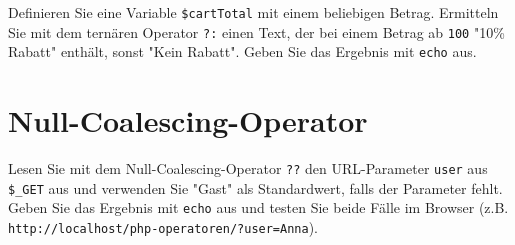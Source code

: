 \documentclass[a4paper,12pt]{article}
\begin{document}
Definieren Sie eine Variable \texttt{\$cartTotal} mit einem beliebigen Betrag. Ermitteln Sie mit dem ternären Operator \texttt{?:} einen Text, der bei einem Betrag ab \texttt{100} "10\% Rabatt" enthält, sonst "Kein Rabatt". Geben Sie das Ergebnis mit \texttt{echo} aus.

\section{Null-Coalescing-Operator}

Lesen Sie mit dem Null-Coalescing-Operator \texttt{??} den URL-Parameter \texttt{user} aus \texttt{\$\_GET} aus und verwenden Sie "Gast" als Standardwert, falls der Parameter fehlt. Geben Sie das Ergebnis mit \texttt{echo} aus und testen Sie beide Fälle im Browser (z.B. \texttt{http://localhost/php-operatoren/?user=Anna}).
\end{document}
